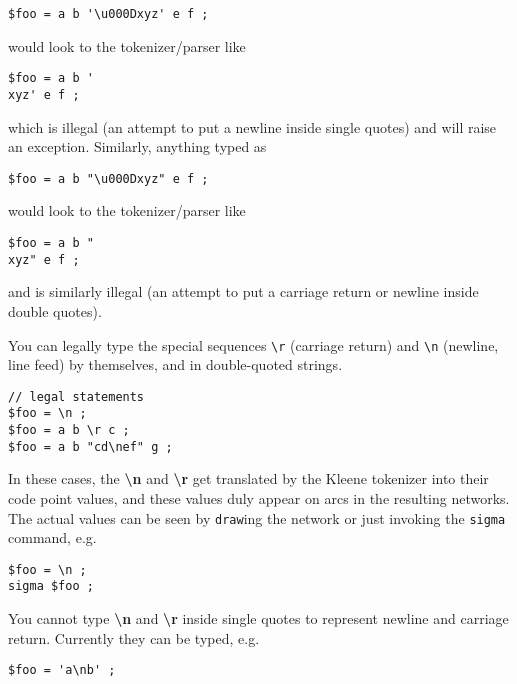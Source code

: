 \begin{Verbatim}[fontsize=\small]
$foo = a b '\u000Dxyz' e f ;
\end{Verbatim}

\noindent
would look to the tokenizer/parser like

\begin{Verbatim}[fontsize=\small]
$foo = a b '
xyz' e f ;
\end{Verbatim}

\noindent
which is illegal (an attempt to put a newline inside single quotes) and will
raise an exception.  Similarly, anything typed as

\begin{Verbatim}[fontsize=\small]
$foo = a b "\u000Dxyz" e f ;
\end{Verbatim}

\noindent
would look to the tokenizer/parser like

\begin{Verbatim}[fontsize=\small]
$foo = a b "
xyz" e f ;
\end{Verbatim}

\noindent
and is similarly illegal (an attempt to put a carriage return or newline
inside double quotes).  

You can legally type the special sequences \texttt{\textbackslash{}r}
(carriage return) and \texttt{\textbackslash{}n} (newline, line feed) by
themselves, and in double-quoted strings.

\begin{Verbatim}[fontsize=\small]
// legal statements
$foo = \n ;
$foo = a b \r c ;
$foo = a b "cd\nef" g ;
\end{Verbatim}

\noindent
In these cases, the \textbf{\textbackslash{}n} and
\textbf{\textbackslash{}r} get translated by the Kleene tokenizer into
their code point values, and these values duly appear on arcs in the
resulting networks.  The actual values can be seen by \texttt{draw}ing
the network or just invoking the \texttt{sigma} command, e.g.

\begin{Verbatim}[fontsize=\small]
$foo = \n ;
sigma $foo ;
\end{Verbatim}

You cannot type \textbf{\textbackslash{}n} and \textbf{\textbackslash{}r}
inside single quotes to represent newline and carriage return.  Currently
they can be typed, e.g.

\begin{Verbatim}[fontsize=\small]
$foo = 'a\nb' ;
\end{Verbatim}

